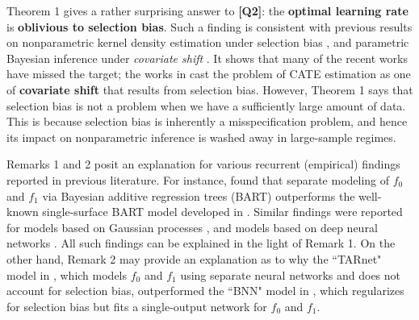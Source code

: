 \documentclass [PhD] {uclathes}
\begin{document}
Theorem 1 gives a rather surprising answer to \textbf{[Q2]}: the \textbf{optimal learning rate} is \textbf{oblivious to selection bias}. Such a finding is consistent with previous results on nonparametric kernel density estimation under selection bias \cite{borrajo2017bandwidth}, and parametric Bayesian inference under \textit{covariate shift} \cite{shimodaira2000improving,sugiyama2007mixture}. It shows that many of the recent works have missed the target; the works in \cite{johansson2016learning,shalit2016estimating,alaa2017bayesian} cast the problem of CATE estimation as one of \textbf{covariate shift} that results from selection bias. However, Theorem 1 says that selection bias is not a problem when we have a sufficiently large amount of data. This is because selection bias is inherently a misspecification problem, and hence its impact on nonparametric inference is washed away in large-sample regimes. 

Remarks 1 and 2 posit an explanation for various recurrent (empirical) findings reported in previous literature. For instance, \cite{hahn2017bayesian} found that separate modeling of $f_0$ and $f_1$ via Bayesian additive regression trees (BART) outperforms the well-known single-surface BART model developed in \cite{hill2011bayesian}. Similar findings were reported for models based on Gaussian processes \cite{alaa2017bayesian}, and models based on deep neural networks \cite{shalit2016estimating}. All such findings can be explained in the light of Remark 1. On the other hand, Remark 2 may provide an explanation as to why the ``TARnet" model in \cite{shalit2016estimating}, which models $f_0$ and $f_1$ using separate neural networks and does not account for selection bias, outperformed the ``BNN" model in \cite{johansson2016learning}, which regularizes for selection bias but fits a single-output network for $f_0$ and $f_1$. 
\end{document}
